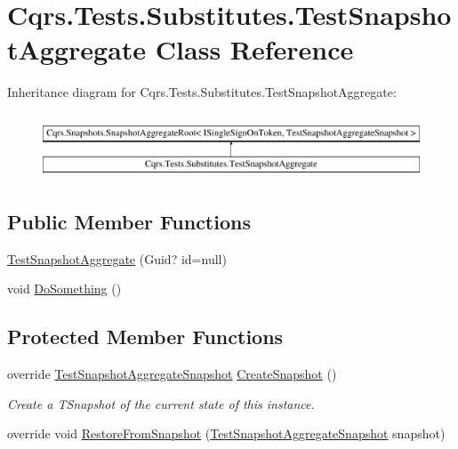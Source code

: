 \hypertarget{classCqrs_1_1Tests_1_1Substitutes_1_1TestSnapshotAggregate}{}\section{Cqrs.\+Tests.\+Substitutes.\+Test\+Snapshot\+Aggregate Class Reference}
\label{classCqrs_1_1Tests_1_1Substitutes_1_1TestSnapshotAggregate}
Inheritance diagram for Cqrs.\+Tests.\+Substitutes.\+Test\+Snapshot\+Aggregate\+:\begin{figure}[H]
\begin{center}
\leavevmode
\includegraphics[height=1.927711cm]{classCqrs_1_1Tests_1_1Substitutes_1_1TestSnapshotAggregate}
\end{center}
\end{figure}
\subsection*{Public Member Functions}
\begin{DoxyCompactItemize}
\item 
\hyperlink{classCqrs_1_1Tests_1_1Substitutes_1_1TestSnapshotAggregate_aeb457b965fe66b7cb642a79e82b3c7ce_aeb457b965fe66b7cb642a79e82b3c7ce}{Test\+Snapshot\+Aggregate} (Guid? id=null)
\item 
void \hyperlink{classCqrs_1_1Tests_1_1Substitutes_1_1TestSnapshotAggregate_ae61a113a0510a62822cebf575fa7d982_ae61a113a0510a62822cebf575fa7d982}{Do\+Something} ()
\end{DoxyCompactItemize}
\subsection*{Protected Member Functions}
\begin{DoxyCompactItemize}
\item 
override \hyperlink{classCqrs_1_1Tests_1_1Substitutes_1_1TestSnapshotAggregateSnapshot}{Test\+Snapshot\+Aggregate\+Snapshot} \hyperlink{classCqrs_1_1Tests_1_1Substitutes_1_1TestSnapshotAggregate_a423bba964aa7fe1f8e89fbb153d7db37_a423bba964aa7fe1f8e89fbb153d7db37}{Create\+Snapshot} ()
\begin{DoxyCompactList}\small\item\em Create a {\itshape T\+Snapshot}  of the current state of this instance. \end{DoxyCompactList}\item 
override void \hyperlink{classCqrs_1_1Tests_1_1Substitutes_1_1TestSnapshotAggregate_aeebfef7170bfd350e4ae2bccf11e60ee_aeebfef7170bfd350e4ae2bccf11e60ee}{Restore\+From\+Snapshot} (\hyperlink{classCqrs_1_1Tests_1_1Substitutes_1_1TestSnapshotAggregateSnapshot}{Test\+Snapshot\+Aggregate\+Snapshot} snapshot)
\end{DoxyCompactItemize}

